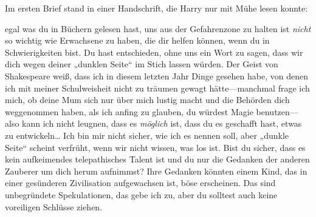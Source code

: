 Im ersten Brief stand in einer Handschrift, die Harry nur mit Mühe lesen konnte:

\begin{writtenNote}

egal was du in Büchern gelesen hast, uns aus der Gefahrenzone zu halten ist \emph{nicht} so wichtig wie Erwachsene zu haben, die dir helfen können, wenn du in Schwierigkeiten bist. Du hast entschieden, ohne uns ein Wort zu sagen, dass wir dich wegen deiner „dunklen Seite“ im Stich lassen würden. Der Geist von Shakespeare weiß, dass ich in diesem letzten Jahr Dinge gesehen habe, von denen ich mit meiner Schulweisheit nicht zu träumen gewagt hätte—manchmal frage ich mich, ob deine Mum sich nur über mich lustig macht und die Behörden dich weggenommen haben, als ich anfing zu glauben, du würdest Magie benutzen—also kann ich nicht leugnen, dass es \emph{möglich} ist, dass du es geschafft hast, etwas zu entwickeln… Ich bin mir nicht sicher, wie ich es nennen soll, aber „dunkle Seite“ scheint verfrüht, wenn wir nicht wissen, was los ist. Bist du sicher, dass es kein aufkeimendes telepathisches Talent ist und du nur die Gedanken der anderen Zauberer um dich herum aufnimmst? Ihre Gedanken könnten einem Kind, das in einer gesünderen Zivilisation aufgewachsen ist, böse erscheinen. Das sind unbegründete Spekulationen, das gebe ich zu, aber du solltest auch keine voreiligen Schlüsse ziehen.


\end{writtenNote}
